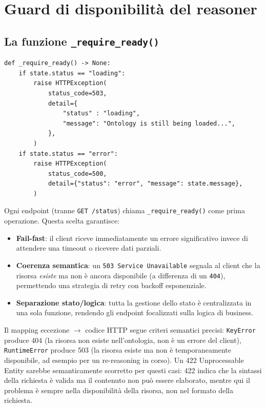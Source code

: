 \documentclass[a4paper,12pt]{article}
\begin{document}
\section{Guard di disponibilit\`{a} del reasoner}

\subsection{La funzione \texttt{\_require\_ready()}}

\begin{lstlisting}[caption={Guard per lo stato del reasoner.}]
def _require_ready() -> None:
    if state.status == "loading":
        raise HTTPException(
            status_code=503,
            detail={
                "status" : "loading",
                "message": "Ontology is still being loaded...",
            },
        )
    if state.status == "error":
        raise HTTPException(
            status_code=500,
            detail={"status": "error", "message": state.message},
        )
\end{lstlisting}

\noindent Ogni endpoint (tranne \texttt{GET /status}) chiama \texttt{\_require\_ready()}
come prima operazione. Questa scelta garantisce:

\begin{itemize}
  \item \textbf{Fail-fast}: il client riceve immediatamente un errore
        significativo invece di attendere una timeout o ricevere dati parziali.
  \item \textbf{Coerenza semantica}: un \texttt{503 Service Unavailable}
        segnala al client che la risorsa \textit{esiste} ma non \`{e} ancora
        disponibile (a differenza di un \texttt{404}), permettendo una
        strategia di retry con backoff esponenziale.
  \item \textbf{Separazione stato/logica}: tutta la gestione dello stato
        \`{e} centralizzata in una sola funzione, rendendo gli endpoint
        focalizzati sulla logica di business.
\end{itemize}

Il mapping eccezione $\rightarrow$ codice HTTP segue criteri semantici precisi:
\texttt{KeyError} produce 404 (la risorsa non esiste nell'ontologia, non
\`{e} un errore del client), \texttt{RuntimeError} produce 503 (la risorsa
esiste ma non \`{e} temporaneamente disponibile, ad esempio per un re-reasoning
in corso). Un 422 Unprocessable Entity sarebbe semanticamente scorretto per
questi casi: 422 indica che la sintassi della richiesta \`{e} valida ma il
contenuto non pu\`{o} essere elaborato, mentre qui il problema \`{e} sempre
nella disponibilit\`{a} della risorsa, non nel formato della richiesta.
\end{document}
